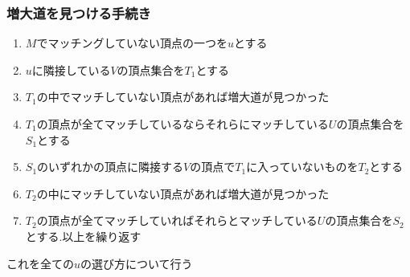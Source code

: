 \documentclass[a4j,10.5pt]{jarticle}
\theoremstyle{break}
\begin{document}
\subsubsection*{増大道を見つける手続き}
\begin{enumerate}
\item $M$でマッチングしていない頂点の一つを$u$とする
\item $u$に隣接している$V$の頂点集合を$T_1$とする
\item $T_1$の中でマッチしていない頂点があれば増大道が見つかった
\item $T_1$の頂点が全てマッチしているならそれらにマッチしている$U$の頂点集合を$S_1$とする
\item $S_1$のいずれかの頂点に隣接する$V$の頂点で$T_1$に入っていないものを$T_2$とする
\item $T_2$の中にマッチしていない頂点があれば増大道が見つかった
\item $T_2$の頂点が全てマッチしていればそれらとマッチしている$U$の頂点集合を$S_2$とする.以上を繰り返す
\end{enumerate}

これを全ての$u$の選び方について行う
\end{document}
